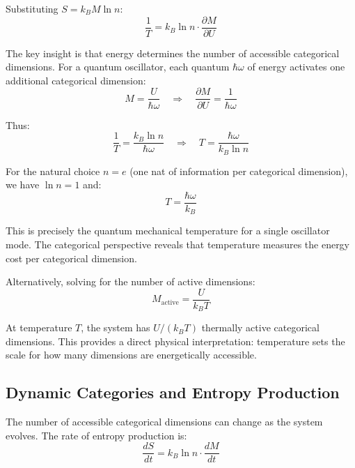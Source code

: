 Substituting $S = k_B M \ln n$:
\begin{equation}
\frac{1}{T} = k_B \ln n \cdot \frac{\partial M}{\partial U}
\end{equation}

The key insight is that energy determines the number of accessible categorical dimensions. For a quantum oscillator, each quantum $\hbar\omega$ of energy activates one additional categorical dimension:
\begin{equation}
M = \frac{U}{\hbar\omega}
\quad \Rightarrow \quad
\frac{\partial M}{\partial U} = \frac{1}{\hbar\omega}
\end{equation}

Thus:
\begin{equation}
\frac{1}{T} = \frac{k_B \ln n}{\hbar\omega}
\quad \Rightarrow \quad
T = \frac{\hbar\omega}{k_B \ln n}
\end{equation}

For the natural choice $n = e$ (one nat of information per categorical dimension), we have $\ln n = 1$ and:
\begin{equation}
\boxed{T = \frac{\hbar\omega}{k_B}}
\label{eq:categorical_temperature}
\end{equation}

This is precisely the quantum mechanical temperature for a single oscillator mode. The categorical perspective reveals that temperature measures the energy cost per categorical dimension.

Alternatively, solving for the number of active dimensions:
\begin{equation}
M_{\text{active}} = \frac{U}{k_B T}
\end{equation}

At temperature $T$, the system has $U/(k_B T)$ thermally active categorical dimensions. This provides a direct physical interpretation: temperature sets the scale for how many dimensions are energetically accessible.

\subsection{Dynamic Categories and Entropy Production}

The number of accessible categorical dimensions can change as the system evolves. The rate of entropy production is:
\begin{equation}
\frac{dS}{dt} = k_B \ln n \cdot \frac{dM}{dt}
\end{equation}

